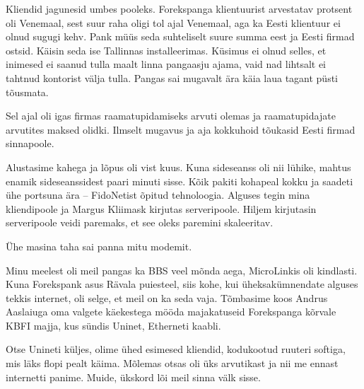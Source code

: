 
Kliendid jagunesid umbes pooleks. Forekspanga klientuurist arvestatav 
protsent oli Venemaal, sest suur 
raha oligi tol ajal Venemaal, aga ka Eesti klientuur ei olnud sugugi kehv. Pank 
müüs seda suhteliselt suure summa eest ja Eesti firmad 
ostsid. Käisin seda ise Tallinnas installeerimas. Küsimus ei olnud 
selles, et inimesed ei saanud tulla maalt linna pangaasju ajama, vaid nad 
lihtsalt ei tahtnud kontorist välja tulla. Pangas sai mugavalt ära käia 
laua tagant püsti tõusmata.


Sel ajal oli igas firmas raamatupidamiseks arvuti olemas ja raamatupidajate 
arvutites maksed olidki. Ilmselt mugavus ja aja kokkuhoid tõukasid
Eesti firmad sinnapoole.


Alustasime kahega ja lõpus oli vist kuus. Kuna 
sideseanss oli nii lühike, mahtus enamik sideseanssidest paari minuti 
sisse. Kõik pakiti kohapeal kokku ja saadeti ühe portsuna ära -- FidoNetist õpitud tehnoloogia. Alguses tegin mina kliendipoole ja 
Margus Kliimask kirjutas serveripoole. Hiljem kirjutasin serveripoole veidi paremaks, et see oleks paremini skaleeritav.


Ühe masina taha sai panna mitu modemit.


Minu meelest oli meil pangas ka BBS veel mõnda aega, 
MicroLinkis oli kindlasti. Kuna Forekspank asus Rävala puiesteel, siis kohe, kui 
üheksakümnendate alguses tekkis internet, oli selge, et meil on ka 
seda vaja. Tõmbasime koos Andrus Aaslaiuga oma valgete käekestega mööda majakatuseid Forekspanga kõrvale KBFI majja, 
kus sündis Uninet, Etherneti kaabli.


Otse Unineti küljes, olime ühed esimesed kliendid, kodukootud 
ruuteri softiga, mis läks flopi pealt käima. Mõlemas otsas oli üks 
arvutikast ja nii me ennast internetti panime. Muide, ükskord 
lõi meil sinna välk sisse.

